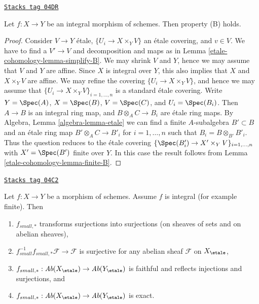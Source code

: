 \begin{lemma}[Integral B]
\label{etale-cohomology-lemma-integral-B}
\href{https://stacks.math.columbia.edu/tag/04DR}{\texttt{Stacks tag 04DR}}

Let $f : X \to Y$ be an integral morphism of schemes.
Then property (B) holds.
\end{lemma}

\begin{proof}
Consider $V \to Y$ \'etale, $\{U_i \to X \times_Y V\}$ an \'etale covering, and
$v \in V$. We have to find a $V' \to V$ and decomposition and maps as in
Lemma \ref{etale-cohomology-lemma-simplify-B}.
We may shrink $V$ and $Y$, hence we may assume that $V$ and $Y$ are affine.
Since $X$ is integral over $Y$, this also implies that $X$ and
$X \times_Y V$ are affine. We may refine the covering
$\{U_i \to X \times_Y V\}$, and hence we may assume that
$\{U_i \to X \times_Y V\}_{i = 1, \ldots, n}$ is a standard \'etale covering.
Write $Y = \Spec(A)$, $X = \Spec(B)$,
$V = \Spec(C)$, and $U_i = \Spec(B_i)$.
Then $A \to B$ is an integral ring map, and $B \otimes_A C \to B_i$ are
\'etale ring maps. By
Algebra, Lemma \ref{algebra-lemma-etale}
we can find a finite $A$-subalgebra $B' \subset B$ and an \'etale ring
map $B' \otimes_A C \to B'_i$ for $i = 1, \ldots, n$
such that $B_i = B \otimes_{B'} B'_i$. Thus the question
reduces to the \'etale covering
$\{\Spec(B'_i) \to X' \times_Y V\}_{i = 1, \ldots, n}$
with $X' = \Spec(B')$ finite over $Y$.
In this case the result follows from
Lemma \ref{etale-cohomology-lemma-finite-B}.
\end{proof}

\begin{lemma}
\label{etale-cohomology-lemma-what-integral}
\href{https://stacks.math.columbia.edu/tag/04C2}{\texttt{Stacks tag 04C2}}

Let $f : X \to Y$ be a morphism of schemes.
Assume $f$ is integral (for example finite).
Then
\begin{enumerate}
\item $f_{small, *}$ transforms surjections into surjections (on sheaves
of sets and on abelian sheaves),
\item $f_{small}^{-1}f_{small, *}\mathcal{F} \to \mathcal{F}$
is surjective for any abelian sheaf $\mathcal{F}$ on $X_\etale$,
\item
$f_{small, *} :
\textit{Ab}(X_\etale)
\to
\textit{Ab}(Y_\etale)$
is faithful and reflects injections and surjections, and
\item
$f_{small, *} :
\textit{Ab}(X_\etale)
\to
\textit{Ab}(Y_\etale)$
is exact.
\end{enumerate}
\end{lemma}

